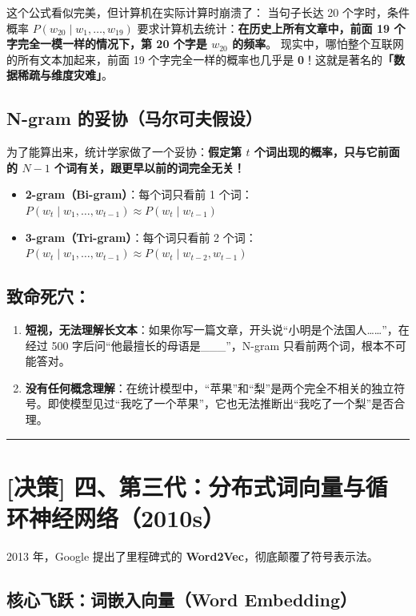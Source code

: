 这个公式看似完美，但计算机在实际计算时崩溃了：
当句子长达 20 个字时，条件概率 $P(w_{20} \mid w_1, \dots, w_{19})$ 要求计算机去统计：\textbf{在历史上所有文章中，前面 19 个字完全一模一样的情况下，第 20 个字是 $w_{20}$ 的频率}。
现实中，哪怕整个互联网的所有文本加起来，前面 19 个字完全一样的概率也几乎是 \textbf{0}！这就是著名的\textbf{「数据稀疏与维度灾难」}。

\subsection{N-gram 的妥协（马尔可夫假设）}

为了能算出来，统计学家做了一个妥协：\textbf{假定第 $t$ 个词出现的概率，只与它前面的 $N-1$ 个词有关，跟更早以前的词完全无关！}
\begin{itemize}
  \item \textbf{2-gram（Bi-gram）}：每个词只看前 1 个词：$P(w_t \mid w_1, \dots, w_{t-1}) \approx P(w_t \mid w_{t-1})$
  \item \textbf{3-gram（Tri-gram）}：每个词只看前 2 个词：$P(w_t \mid w_1, \dots, w_{t-1}) \approx P(w_t \mid w_{t-2}, w_{t-1})$
\end{itemize}

\subsection{致命死穴：}

\begin{enumerate}
  \item \textbf{短视，无法理解长文本}：如果你写一篇文章，开头说“小明是个法国人\dots{}\dots{}”，在经过 500 字后问“他最擅长的母语是\_\_\_”，N-gram 只看前两个词，根本不可能答对。
  \item \textbf{没有任何概念理解}：在统计模型中，“苹果”和“梨”是两个完全不相关的独立符号。即使模型见过“我吃了一个苹果”，它也无法推断出“我吃了一个梨”是否合理。
\end{enumerate}

\vspace{0.8em}\hrule\vspace{0.8em}

\section{[决策] 四、第三代：分布式词向量与循环神经网络（2010s）}

2013 年，Google 提出了里程碑式的 \textbf{Word2Vec}，彻底颠覆了符号表示法。

\subsection{核心飞跃：词嵌入向量（Word Embedding）}

